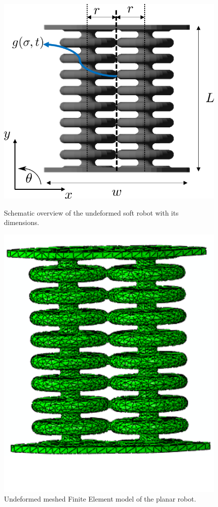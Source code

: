 \begin{figure}[H] 
    \begin{minipage}[b]{0.49\linewidth}
     \centering
    \includegraphics[width=\linewidth]{Figures/Chapter3/dimensions.png} 
    \caption{Schematic overview of the undeformed soft robot with its dimensions.} 
    \label{fig3:dim} 
       \end{minipage} 
    \begin{minipage}[b]{0.49\linewidth}
     \centering
    \includegraphics[width=0.7\linewidth]{Figures/Chapter3/undeformed2.png} 
    \caption{Undeformed meshed Finite Element model of the planar robot.} 
    \label{fig3:FemModel} 
    \end{minipage} 
\end{figure}

